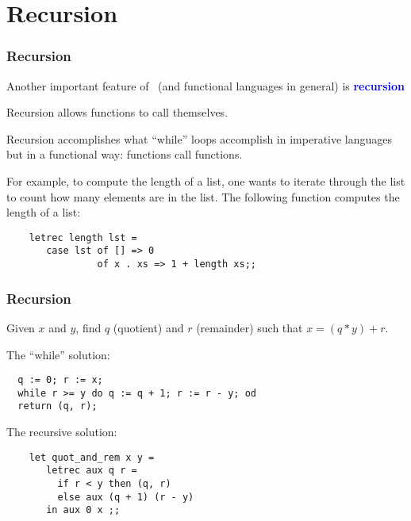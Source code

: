 \documentclass[12pt,red]{beamer}
\newcommand{\cemph}[1]{\textcolor{blue}{\textbf{#1}}}
\begin{document}
\section{Recursion}


\begin{frame}[fragile]
  \frametitle{Recursion}

  Another important feature of \ML\ (and functional languages in
  general) is \cemph{recursion}

  \vspace{0.05in}

  Recursion allows functions to call themselves.

  \vspace{0.1in}

  Recursion accomplishes what ``while'' loops accomplish in imperative
  languages but in a functional way: functions call functions.

  \vspace{0.1in}

  For example, to compute the length of a list, one wants to iterate
  through the list to count how many elements are in the list.  The
  following function computes the length of a list:
  \begin{beamerboxesrounded}[shadow=true]{}
    \begin{center}
    \begin{lstlisting}
    letrec length lst =
       case lst of [] => 0
                of x . xs => 1 + length xs;;
    \end{lstlisting}
    \end{center}
  \end{beamerboxesrounded}

\end{frame}


\begin{frame}[fragile]
  \frametitle{Recursion}

  Given $x$ and $y$, find $q$ (quotient) and $r$ (remainder) such that
  $x = (q * y) + r$.

  \vspace{0.1in}

  The ``while'' solution:
  \begin{verbatim}
  q := 0; r := x;
  while r >= y do q := q + 1; r := r - y; od
  return (q, r);
  \end{verbatim}

  \vspace*{-0.2in}
  The recursive solution:
  \vspace*{-0.1in}
  \begin{beamerboxesrounded}[shadow=true]{}
    \begin{center}
    \begin{lstlisting}
    let quot_and_rem x y =
       letrec aux q r =
         if r < y then (q, r)
         else aux (q + 1) (r - y)
       in aux 0 x ;;
    \end{lstlisting}
    \end{center}
  \end{beamerboxesrounded}
\end{frame}
\end{document}
